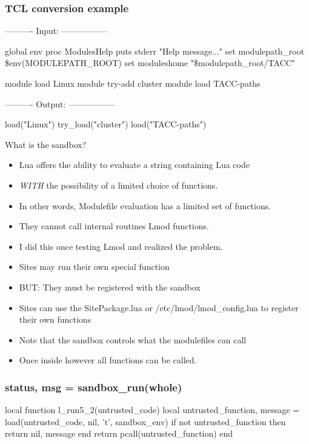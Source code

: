 \documentclass{beamer}
\begin{document}
\begin{frame}[fragile]
\begin{frame}[fragile]
    \frametitle{TCL conversion example}
 {\tiny
   \begin{semiverbatim}
---------- Input: -----------------

global env
proc ModulesHelp { } {
puts stderr "Help message..."
}
set modulepath\_root  \$env(MODULEPATH\_ROOT)
set moduleshome     "\$modulepath\_root/TACC"

module load Linux
module try-add cluster
module load TACC-paths

---------- Output: -----------------

load("Linux")
try_load("cluster")
load("TACC-paths")
    \end{semiverbatim}
}
\end{frame}


\begin{frame}{What is the sandbox?}
  \begin{itemize}
    \item Lua offers the ability to evaluate a string containing Lua
      code
    \item \emph{WITH} the possibility of a limited choice of
      functions.
    \item In other words, Modulefile evaluation has a limited set of functions.
    \item They cannot call internal routines Lmod functions.
    \item I did this once testing Lmod and realized the problem.
    \item Sites may run their own special function
    \item BUT: They must be registered with the sandbox 
    \item Sites can use the SitePackage.lua or
      /etc/lmod/lmod\_config.lua to register their own functions
    \item Note that the sandbox controls what the modulefiles can call
    \item Once inside however all functions can be called.
  \end{itemize}
\end{frame}

\begin{frame}[fragile]
    \frametitle{status, msg = sandbox\_run(whole)}
 {\tiny
    \begin{semiverbatim}
local function l\_run5\_2(untrusted\_code)
  local untrusted\_function, message = load(untrusted\_code, nil, 't', sandbox\_env)
  if not untrusted\_function then return nil, message end
  return pcall(untrusted\_function)
end


\end{semiverbatim}}
\end{frame}
\end{frame}
\end{document}
